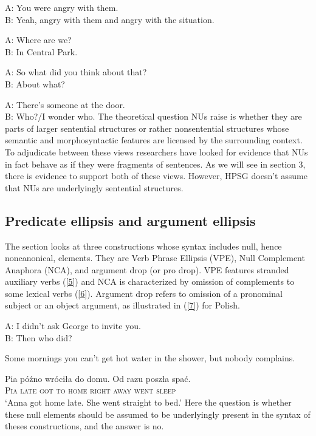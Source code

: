 \documentclass[output=paper]{langsci/langscibook}
\begin{document}
{\ea A: You were angry with them.\\ B: Yeah, angry with them and angry with the situation.\label{1}\z

\ea A: Where are we? \\B: In Central Park.\label{2}\z

\ea A: So what did you think about that?\\ B: About what? \label{3}\z

\ea A: There's someone at the door. \\B: Who?/I wonder who. \label{4}\z
The theoretical question NUs raise is whether they are parts of larger sentential structures or rather nonsentential structures whose semantic and morphosyntactic features are licensed by the surrounding context. To adjudicate between these views researchers have looked for evidence that NUs in fact behave as if they were fragments of sentences. As we will see in section 3, there is evidence to support both of these views. However, HPSG doesn't assume that NUs are underlyingly sentential structures.

\subsection{Predicate ellipsis and argument ellipsis}
The section looks at three constructions whose syntax includes null, hence noncanonical, elements. They are Verb Phrase Ellipsis (VPE), Null Complement Anaphora (NCA), and argument drop (or pro drop). VPE features stranded auxiliary verbs (\ref{5}) and NCA is characterized by omission of complements to some lexical verbs (\ref{6}). Argument drop refers to omission of a pronominal subject or an object argument, as illustrated in (\ref{7}) for Polish.

\ea A: I didn't ask George to invite you.\\B: Then who did?\label{5}\z

\ea Some mornings you can't get hot water in the shower, but nobody complains. \label{6} \z

\ea
\gll Pia p\'{o}\'{z}no wr\'{o}ci\l a do domu. {Od razu} posz\l a spa\'{c}.\\
\textsc{Pia} \textsc{late} \textsc{got} \textsc{to} \textsc{home} \textsc{right away} \textsc{went} \textsc{sleep}\\
\glt `Anna got home late. She went straight to bed.'
\label{7} \z
Here the question is whether these null elements should be assumed to be underlyingly present in the syntax of theses constructions, and the answer is no.

}
\end{document}
